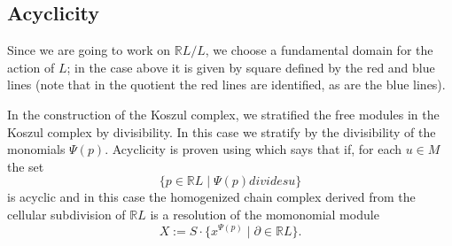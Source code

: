\documentclass[11pt]{amsart}
\numberwithin{equation}{section}
\theoremstyle{definition}
\theoremstyle{remark}
\newcommand{\RR}{\mathbb R}
\def\p{\partial}
\begin{document}
\subsection{Acyclicity}

Since we are going to work on $\RR L/L$, we choose a fundamental domain for the action of $L$; in the case above it is given by square defined by the red and blue lines (note that in the quotient the red lines are identified, as are the blue lines).

In the construction of the Koszul complex, we stratified the free modules in the 
Koszul complex by divisibility.  In this case we stratify by the divisibility of the 
monomials $\Psi(p)$. Acyclicity is proven using \cite[Proposition 2.13]{BCHSY],} which says that if, for each $u\in M$ the set 
$$
\{ p\in \RR L \mid \Psi(p) divides u\}
$$
is acyclic and in this case the homogenized chain complex derived from the cellular
subdivision of $\RR L$ is a resolution of the momonomial module
$$
 X := S\cdot \{x^{\Psi(p)} \mid \p\in \RR L\}.
$$



\end{document}

